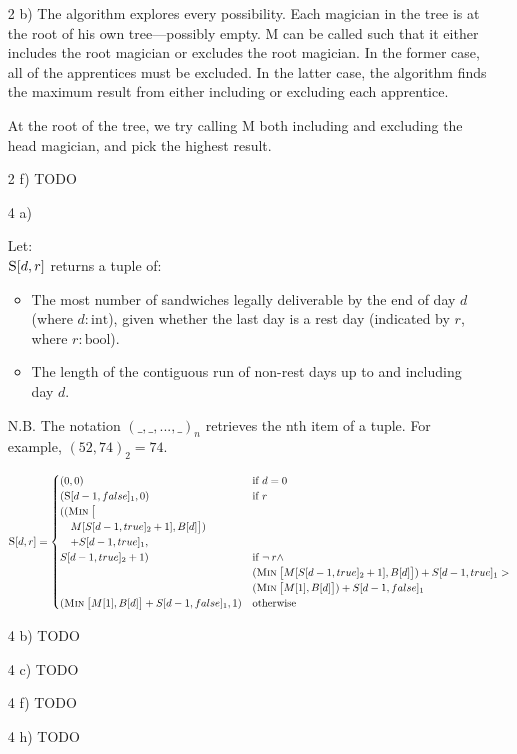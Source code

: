 \documentclass[]{article}
\begin{document}
\begin{itemize}
	\item [2 b)] The algorithm explores every possibility. Each magician in the tree is at the root of his own tree---possibly empty. \textsc{M} can be called such that it either includes the root magician or excludes the root magician. In the former case, all of the apprentices must be excluded. In the latter case, the algorithm finds the maximum result from either including or excluding each apprentice.
	
	At the root of the tree, we try calling \textsc{M} both including and excluding the head magician, and pick the highest result.
	
	\item [2 f)] TODO
	
	\item [4 a)] 
	
		Let: \\ 
		$\textsc{S}[d, r]$ returns a tuple of:
		\begin{itemize}
			\item The most number of sandwiches legally deliverable by the end of day $d$ (where $d: \text{int}$), given whether the last day is a rest day (indicated by $r$, where $r: \text{bool}$).
			\item The length of the contiguous run of non-rest days up to and including day $d$.
		\end{itemize}
		
		N.B. The notation $(\_, \_, ..., \_)_n$ retrieves the nth item of a tuple. For example, $(52, 74)_2 = 74$.
		
		$$
		\textsc{S}[d, r] =
		\begin{cases}
			(0,0)
			& \text{if } d = 0 \\
		
			(\textsc{S}[d-1, false]_1, 0)
			& \text{if } r \\
			
			(( \textsc{Min} \: \big[ \\
			\hspace{1em} M[S[d-1,true]_2+1], B[d] \big]) \\ 
			\hspace{1em} + S[d-1,true]_1, \\
			 S[d-1, true]_2 + 1)
			& \text{if } \neg \: r \land \\
			& (\textsc{Min} \: \big[ M[S[d-1,true]_2+1], B[d] \big]) + S[d-1,true]_1 > \\
			& (\textsc{Min} \: \big[ M[1], B[d] \big]) + S[d-1, false]_1 \\
			
			(\textsc{Min} \: \big[ M[1], B[d] \big] + S[d-1,false]_1, 1 )
			& \text{otherwise}
		\end{cases}
		$$
		
	\item [4 b)] TODO
	
	\item [4 c)] TODO
	
	\item [4 f)] TODO
	
	\item [4 h)] TODO
	
\end{itemize}
\end{document}
